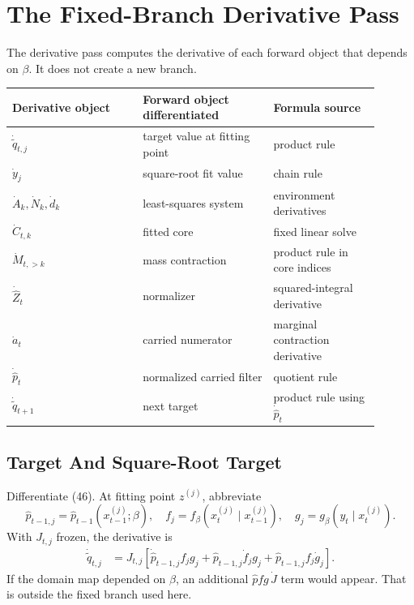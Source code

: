 \documentclass[11pt]{article}
\theoremstyle{remark}
\begin{document}
\section{The Fixed-Branch Derivative Pass}

The derivative pass computes the derivative of each forward object that depends
on \(\beta\).  It does not create a new branch.

\begin{center}
\begin{tabular}{p{0.32\linewidth}p{0.32\linewidth}p{0.26\linewidth}}
\toprule
Derivative object & Forward object differentiated & Formula source\\
\midrule
\(\dot{\widetilde q}_{t,j}\) & target value at fitting point & product rule\\
\(\dot y_j\) & square-root fit value & chain rule\\
\(\dot A_k,\dot N_k,\dot d_k\) & least-squares system & environment derivatives\\
\(\dot C_{t,k}\) & fitted core & fixed linear solve\\
\(\dot M_{t,>k}\) & mass contraction & product rule in core indices\\
\(\dot{\widehat Z}_t\) & normalizer & squared-integral derivative\\
\(\dot a_t\) & carried numerator & marginal contraction derivative\\
\(\dot{\widehat p}_t\) & normalized carried filter & quotient rule\\
\(\dot{\widetilde q}_{t+1}\) & next target & product rule using \(\dot{\widehat p}_t\)\\
\bottomrule
\end{tabular}
\end{center}

\subsection{Target And Square-Root Target}

Differentiate (46).  At fitting point \(z^{(j)}\), abbreviate
\[
    \widehat p_{t-1,j}=\widehat p_{t-1}(x_{t-1}^{(j)};\beta),
    \quad
    f_j=f_\beta(x_t^{(j)}\mid x_{t-1}^{(j)}),
    \quad
    g_j=g_\beta(y_t\mid x_t^{(j)}).
    \tag{51}
\]
With \(J_{t,j}\) frozen, the derivative is
\[
\begin{aligned}
    \dot{\widetilde q}_{t,j}
    &=
    J_{t,j}
    \left[
    \dot{\widehat p}_{t-1,j} f_j g_j
    +
    \widehat p_{t-1,j}\dot f_j g_j
    +
    \widehat p_{t-1,j} f_j\dot g_j
    \right].
\end{aligned}
\tag{52}
\]
If the domain map depended on \(\beta\), an additional
\(\widehat p f g\,\dot J\) term would appear.  That is outside the fixed branch
used here.
\end{document}
